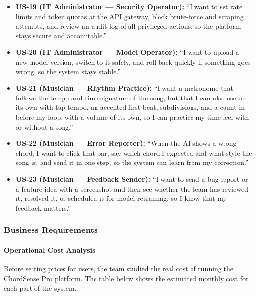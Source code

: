 \documentclass[a4paper]{article}
\begin{document}
\begin{itemize}
    \item \textbf{US-19 (IT Administrator --- Security Operator):} ``I want to set rate limits and token quotas at the API gateway, block brute-force and scraping attempts, and review an audit log of all privileged actions, so the platform stays secure and accountable.''
    \item \textbf{US-20 (IT Administrator --- Model Operator):} ``I want to upload a new model version, switch to it safely, and roll back quickly if something goes wrong, so the system stays stable.''
    \item \textbf{US-21 (Musician --- Rhythm Practice):} ``I want a metronome that follows the tempo and time signature of the song, but that I can also use on its own with tap tempo, an accented first beat, subdivisions, and a count-in before my loop, with a volume of its own, so I can practice my time feel with or without a song.''
    \item \textbf{US-22 (Musician --- Error Reporter):} ``When the AI shows a wrong chord, I want to click that bar, say which chord I expected and what style the song is, and send it in one step, so the system can learn from my correction.''
    \item \textbf{US-23 (Musician --- Feedback Sender):} ``I want to send a bug report or a feature idea with a screenshot and then see whether the team has reviewed it, resolved it, or scheduled it for model retraining, so I know that my feedback matters.''
\end{itemize}

\subsubsection{Business Requirements}

\paragraph{Operational Cost Analysis}

Before setting prices for users, the team studied the real cost of running the ChordSense Pro platform. The table below shows the estimated monthly cost for each part of the system.
\end{document}
